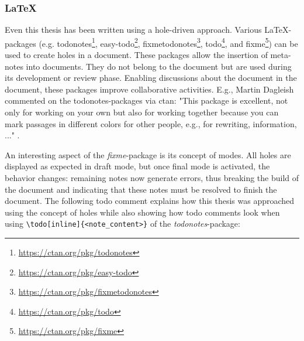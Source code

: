 \subsubsection{\LaTeX}
Even this thesis has been written using a hole-driven approach.
Various \LaTeX-packages (e.g. todonotes\footnote{\url{https://ctan.org/pkg/todonotes}}, easy-todo\footnote{\url{https://ctan.org/pkg/easy-todo}}, fixmetodonotes\footnote{\url{https://ctan.org/pkg/fixmetodonotes}}, todo\footnote{\url{https://ctan.org/pkg/todo}}, and fixme\footnote{\url{https://ctan.org/pkg/fixme}}) can be used to create holes in a document.
These packages allow the insertion of meta-notes into documents.
They do not belong to the document but are used during its development or review phase.
Enabling discussions about the document in the document, these packages improve collaborative activities.
E.g., Martin Dagleish commented on the todonotes-packages via ctan: "This package is excellent, not only for working on your own but also for working together because you can mark passages in different colors for other people, e.g., for rewriting, information, ..." \cite{dagleish_comment_2021}.

An interesting aspect of the \emph{fixme}-package is its concept of modes.
All holes are displayed as expected in draft mode, but once final mode is activated, the behavior changes: remaining notes now generate errors, thus breaking the build of the document and indicating that these notes must be resolved to finish the document.
The following todo comment explains how this thesis was approached using the concept of holes while also showing how todo comments look when using \verb|\todo[inline]{<note_content>}| of the \emph{todonotes}-package:

\vspace{3mm}


